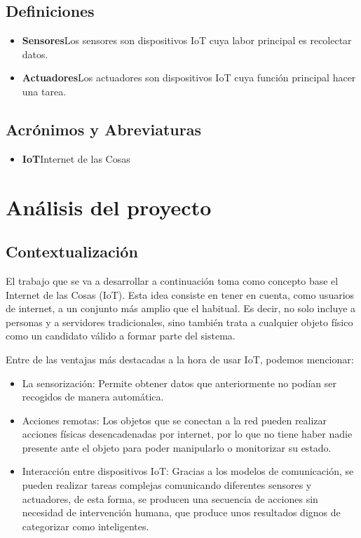\documentclass[12pt, a4paper, twoside]{article}
\newcommand\ttab{\tab \hspace{-5cm}}
\begin{document}
\subsection{Definiciones}
\begin{itemize}
    \item \textbf{Sensores}\ttab Los sensores son dispositivos IoT cuya labor principal es recolectar datos.
    \item \textbf{Actuadores}\ttab Los actuadores son dispositivos IoT cuya función principal hacer una tarea.
  \end{itemize}
\subsection{Acrónimos y Abreviaturas}
\begin{itemize}
    \item \textbf{IoT}\ttab Internet de las Cosas
  \end{itemize}

\section{Análisis del proyecto}
\subsection{Contextualización}
El trabajo que se va a desarrollar a continuación toma como concepto base el Internet de las Cosas (IoT).
Esta idea consiste en tener en cuenta, como usuarios de internet, a un conjunto más amplio que el 
habitual. Es decir, no solo incluye a personas y a servidores tradicionales, sino también trata a cualquier objeto 
físico como un candidato válido a formar parte del sistema.

Entre de las ventajas más destacadas a la hora de usar IoT, podemos mencionar:
\begin{itemize}
    \item La sensorización: Permite obtener datos que anteriormente no podían ser recogidos de manera automática.
    \item Acciones remotas: Los objetos que se conectan a la red pueden realizar acciones físicas desencadenadas por internet,
      por lo que no tiene haber nadie presente ante el objeto para poder manipularlo o monitorizar su estado.
    \item Interacción entre dispositivos IoT: Gracias a los modelos de comunicación, se pueden realizar tareas complejas
      comunicando diferentes sensores y actuadores, de esta forma, se producen una secuencia de acciones sin necesidad
      de intervención humana, que produce unos resultados dignos de categorizar como inteligentes.
\end{itemize}
\end{document}
